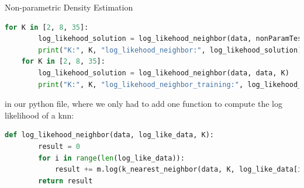 \documentclass[
ngerman,
]{tudaexercise}
\begin{document}
\begin{task}{Non-parametric Density Estimation}
\begin{subtask}
\begin{lstlisting}[language=Python]
	for K in [2, 8, 35]:
		log_likehood_solution = log_likehood_neighbor(data, nonParamTest, K)
		print("K:", K, "log_likehood_neighbor:", log_likehood_solution)
	for K in [2, 8, 35]:
		log_likehood_solution = log_likehood_neighbor(data, data, K)
		print("K:", K, "log_likehood_neighbor_training:", log_likehood_solution)
	\end{lstlisting}
	in our python file, where we only had to add one function to compute the log likelihood of a knn:
	\begin{lstlisting}[language=Python]
	def log_likehood_neighbor(data, log_like_data, K):
		result = 0 
		for i in range(len(log_like_data)):
			result += m.log(k_nearest_neighbor(data, K, log_like_data[i]))
		return result
	\end{lstlisting}
\end{subtask}
\end{task}
\end{document}
